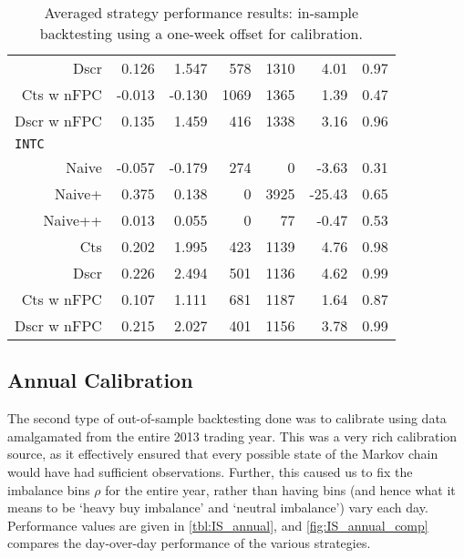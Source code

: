 \begin{table}
\begin{tabular}{@{} *{7}{r} @{}}
Dscr & 0.126 & 1.547 & 578 & 1310 & 4.01 & 0.97 \\
Cts w nFPC & -0.013 & -0.130 & 1069 & 1365 & 1.39 & 0.47 \\
Dscr w nFPC & 0.135 & 1.459 & 416 & 1338 & 3.16 & 0.96 \\[2ex]
\multicolumn{7}{l}{\texttt{INTC}} \\ 
Naive & -0.057 & -0.179 & 274 & 0 & -3.63 & 0.31 \\
Naive+ & 0.375 & 0.138 & 0 & 3925 & -25.43 & 0.65 \\
Naive++ & 0.013 & 0.055 & 0 & 77 & -0.47 & 0.53 \\
Cts & 0.202 & 1.995 & 423 & 1139 & 4.76 & 0.98 \\
Dscr & 0.226 & 2.494 & 501 & 1136 & 4.62 & 0.99 \\
Cts w nFPC & 0.107 & 1.111 & 681 & 1187 & 1.64 & 0.87 \\
Dscr w nFPC & 0.215 & 2.027 & 401 & 1156 & 3.78 & 0.99 \\
\bottomrule
\end{tabular}
\caption[In-sample backtesting performance using week-offset calibration]{Averaged strategy performance results: in-sample backtesting using a one-week offset for calibration.}
\label{tbl:IS_week}
\end{table}

\FloatBarrier
\subsection{Annual Calibration}
The second type of out-of-sample backtesting done was to calibrate using data amalgamated from the entire 2013 trading year. This was a very rich calibration source, as it effectively ensured that every possible state of the Markov chain would have had sufficient observations. Further, this caused us to fix the imbalance bins $\rho$ for the entire year, rather than having bins (and hence what it means to be `heavy buy imbalance' and `neutral imbalance') vary each day. Performance values are given in \autoref{tbl:IS_annual}, and \autoref{fig:IS_annual_comp} compares the day-over-day performance of the various strategies. 

